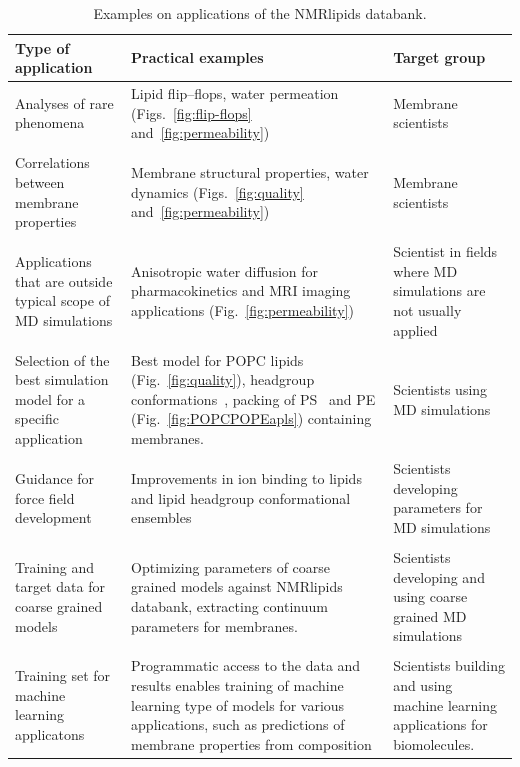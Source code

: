 \documentclass[fleqn,10pt]{wlscirep}
\begin{document}
\begin{table}[t]
    \centering
    \begin{tabular}{p{5.0cm}  p{5.0cm}  p{4.0cm}}
    Type of application     & Practical examples & Target group \\
    \hline
    Analyses of rare phenomena               & Lipid flip--flops, water permeation (Figs.~\ref{fig:flip-flops} and~\ref{fig:permeability}) & Membrane scientists \\
    \\
    Correlations between membrane properties & 
    Membrane structural properties, water dynamics (Figs.~\ref{fig:quality} and~\ref{fig:permeability}) & 
    Membrane scientists \\
    \\
    Applications that are outside typical scope of MD simulations & 
    Anisotropic water diffusion for pharmacokinetics and MRI imaging applications (Fig.~\ref{fig:permeability}) & 
    Scientist in fields where MD simulations are not usually applied \\
    \\
    Selection of the best simulation model for a specific application & 
    Best model for POPC lipids (Fig.~\ref{fig:quality}), headgroup conformations~\cite{bacle21}, 
    packing of PS~\cite{antila22b} and PE (Fig.~\ref{fig:POPCPOPEapls}) containing membranes. &
    Scientists using MD simulations \\
    \\
    Guidance for force field development & 
    Improvements in ion binding to lipids~\cite{melcr18,melcr20} and lipid headgroup conformational ensembles~\cite{yu21,dickson22,grote20} &
    Scientists developing parameters for MD simulations \\
    \\
    Training and target data for coarse grained models & 
    Optimizing parameters of coarse grained models against NMRlipids databank, extracting continuum parameters for membranes. &
    Scientists developing and using coarse grained MD simulations \\
    \\
    Training set for machine learning applicatons &
    Programmatic access to the data and results enables training of machine learning type of models for various applications, such as predictions of membrane properties from composition & Scientists building and using machine learning applications for biomolecules.  
    \end{tabular}
    \caption{Examples on applications of the NMRlipids databank.}
    \label{tab:applications}
\end{table}
\end{document}
